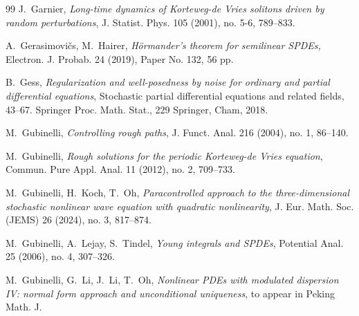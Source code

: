 \documentclass[letterpaper, 11pt,  reqno]{amsart}
\newcommand{\1}{\hspace{0.5mm}\textup{I}\hspace{0.5mm}}
\numberwithin{equation}{section}
\numberwithin{theorem}{section}
\begin{document}
\begin{thebibliography}{99}
J.~Garnier, 
{\it Long-time dynamics of Korteweg-de Vries solitons driven by random perturbations}, J. Statist.
Phys. 105 (2001), no. 5-6, 789--833.


A.~Gerasimovi\v{c}s, M.~Hairer, 
{\it H\"ormander's theorem for semilinear SPDEs,}
Electron. J. Probab. 24 (2019), Paper No. 132, 56 pp. 



B.~Gess, 
{\it Regularization and well-posedness by noise for ordinary and partial differential equations},
 Stochastic partial differential equations and related fields, 43--67. Springer Proc. Math. Stat., 229
Springer, Cham, 2018.





M.~Gubinelli,
{\it Controlling rough paths},
J. Funct. Anal. 216 (2004), no. 1, 86--140.



M.~Gubinelli, 
{\it Rough solutions for the periodic Korteweg-de Vries equation},
Commun. Pure Appl. Anal. 11 (2012), no. 2, 709--733.






%
%
%

M.~Gubinelli, H.~Koch, T.~Oh, 
{\it  Paracontrolled approach to the three-dimensional stochastic nonlinear wave equation with quadratic nonlinearity},  
J. Eur. Math. Soc. (JEMS) 26 (2024), no. 3, 817--874. 





M.~Gubinelli, A.~Lejay, S.~Tindel,
{\it Young integrals and SPDEs},
Potential Anal. 25 (2006), no. 4, 307--326.


M.~Gubinelli, G.~Li, J.~Li, T.~Oh, 
{\it Nonlinear PDEs with modulated dispersion IV: 
normal form approach and unconditional uniqueness},
 to appear in Peking Math. J.




%



\end{thebibliography}
\end{document}
